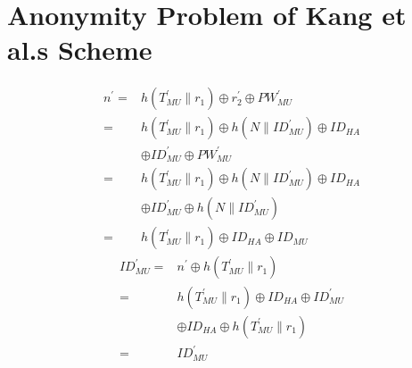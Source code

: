 \documentclass{article}
\begin{document}
\section {Anonymity Problem of Kang et al.s Scheme}
\begin{equation}
    \begin{aligned}
        n^{\prime}=& h\left(T_{M U}^{\prime} \| r_{1}\right) \oplus r_{2}^{\prime} \oplus P W_{M U}^{\prime} \\
        =& h\left(T_{M U}^{\prime} \| r_{1}\right) \oplus h\left(N \| I D_{M U}^{\prime}\right) \oplus I D_{H A} \\
        & \oplus I D_{M U}^{\prime} \oplus P W_{M U}^{\prime} \\
        =& h\left(T_{M U}^{\prime} \| r_{1}\right) \oplus h\left(N \| I D_{M U}^{\prime}\right) \oplus I D_{H A} \\
        & \oplus I D_{M U}^{\prime} \oplus h\left(N \| I D_{M U}^{\prime}\right) \\
        =& h\left(T_{M U}^{\prime} \| r_{1}\right) \oplus I D_{H A} \oplus I D_{M U}
        \end{aligned}
\end{equation}
\begin{equation}
    \begin{aligned}
        I D_{M U}^{\prime}=& n^{\prime} \oplus h\left(T_{M U}^{\prime} \| r_{1}\right) \\
        =& h\left(T_{M U}^{\prime} \| r_{1}\right) \oplus I D_{H A} \oplus I D_{M U}^{\prime} \\
        & \oplus I D_{H A} \oplus h\left(T_{M U}^{\prime} \| r_{1}\right) \\
        =& I D_{M U}^{\prime}
        \end{aligned}
\end{equation}
\end{document}
